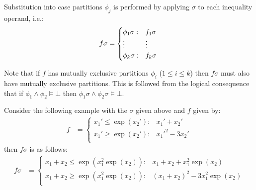 \documentclass[twoside,11pt]{article}
\begin{document}
Substitution into case partitions $\phi_j$ is performed 
by applying $\sigma$ to each inequality operand, i.e.:
\begin{align}
\begin{tabular}{r c c l}
\hspace{-2mm}
  $f\sigma = \begin{cases}
    \phi_1\sigma: & f_1\sigma \\ 
   \vdots&\vdots\\ 
    \phi_k\sigma: & f_k\sigma \\ 
  \end{cases}$
\end{tabular}
\label{SubEq}
\end{align}

Note that if $f$ has mutually exclusive partitions $\phi_i$ ($1 \leq i \leq k$)
then $f\sigma$ must also have mutually exclusive partitions. 
This is followed from the logical consequence that 
if $\phi_1 \land \phi_2 \models \bot$
then $\phi_1\sigma \land \phi_2\sigma \models \bot$.

Consider the following example with the $\sigma$ given above and $f$ given by: 
\begin{align*}
f &= \begin{cases}
 x_1' \leq \exp(x_2'): & x_1' + x_2' \\ 
 x_1' \geq \exp(x_2'): & x_1'^2 - 3x_2' \\ 
\end{cases}
\end{align*}
then $f \sigma$ is as follows:
\begin{align*}
f \sigma &= \begin{cases}
 x_1 + x_2 \leq \exp(x_1^2 \exp(x_2)): & x_1 + x_2 + x_1^2 \exp(x_2) \\ 
 x_1 + x_2 \geq \exp(x_1^2 \exp(x_2)): & (x_1 + x_2)^2 - 3x_1^2 \exp(x_2) \\ 
\end{cases}
\end{align*}
\end{document}
